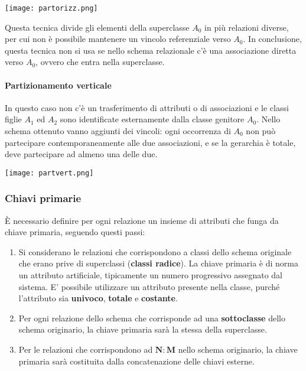 \begin{center}
	\texttt{[image: partorizz.png]}
\end{center}

\begin{note}
	Questa tecnica divide gli elementi della superclasse $A_0$ in più relazioni diverse, per cui non è possibile mantenere un vincolo referenziale verso $A_0$. In conclusione, questa tecnica non si usa se
	nello schema relazionale c’è una associazione diretta verso $A_0$, ovvero che entra nella superclasse.
\end{note}

\paragraph{Partizionamento verticale}
In questo caso non c’è un trasferimento di attributi o di associazioni e le classi figlie $A_1$ ed $A_2$ sono identificate esternamente dalla classe genitore $A_0$. Nello schema ottenuto vanno aggiunti dei vincoli: ogni occorrenza di $A_0$ non può partecipare contemporaneamente alle due associazioni, e se la gerarchia è totale, deve partecipare ad almeno una delle due.

\begin{center}
	\texttt{[image: partvert.png]}
\end{center}

\subsubsection{Chiavi primarie}
È necessario definire per ogni relazione un insieme di attributi che funga da chiave primaria, seguendo questi passi:
\begin{enumerate}
	\item Si considerano le relazioni che corrispondono a classi dello schema originale	che erano prive di superclassi (\textbf{classi radice}). La chiave primaria è di norma un attributo artificiale, tipicamente un numero progressivo	assegnato dal sistema. E’ possibile utilizzare un attributo presente nella classe, purché
	l’attributo sia \textbf{univoco}, \textbf{totale} e \textbf{costante}.
	\item Per ogni relazione dello schema che corrisponde ad una \textbf{sottoclasse} dello schema originario, la chiave primaria sarà la stessa della superclasse.
	\item Per le relazioni che corrispondono ad $\mathbf{N:M}$ nello schema originario, la chiave primaria sarà costituita dalla concatenazione delle chiavi esterne.
\end{enumerate}

